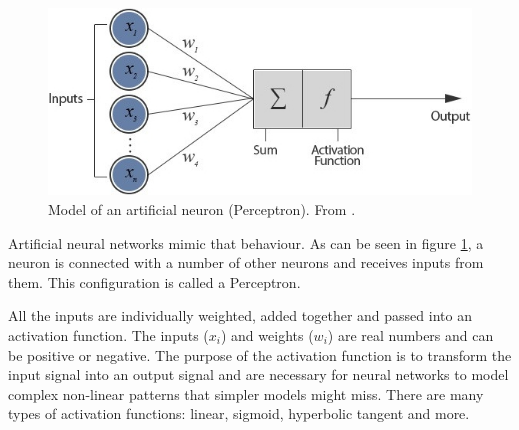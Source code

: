 \begin{figure}[H]%
  \centering
  \includegraphics[width=1\textwidth]{images/nn1.jpeg}
  \caption{Model of an artificial neuron (Perceptron). From \cite{nnarticle2}.}
  \label{fig:artifialneuron}
\end{figure}


Artificial neural networks mimic that behaviour. As can be seen in figure \ref{fig:artifialneuron}, a neuron is connected with a number of other neurons and receives inputs from them. This configuration is called a Perceptron. 

All the inputs are individually weighted, added together and passed into an activation function. The inputs ($x_i$) and weights ($w_i$) are real numbers and can be positive or negative. The purpose of the activation function is to transform the input signal into an output signal and are necessary for neural networks to model complex non-linear patterns that simpler models might miss. There are many types of activation functions: linear, sigmoid, hyperbolic tangent and more. 

